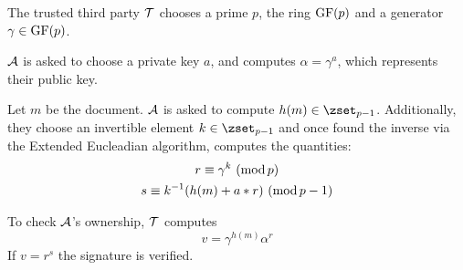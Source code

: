 \documentclass{subfiles}
\begin{document}
    \begin{procedure}
        \caption{DSA()}\label{proc:DSA}
        \nl The trusted third party $\operatorname{\mathcal{T}}$ chooses a prime $p$,
            the ring $\operatorname{GF}(p)$ and a generator $\gamma \in \operatorname{GF}(p)$.
            \DontPrintSemicolon\;

        \nl $\operatorname{\mathcal{A}}$ is asked to choose a private key $a$, 
            and computes $\alpha = \gamma^{a}$, which represents their public key.
            \DontPrintSemicolon\;

        \nl Let $m$ be the document. $\operatorname{\mathcal{A}}$ is asked to compute $h(m) \in \zset_{p - 1}$.
            Additionally, they choose an invertible element $k \in \zset_{p - 1}$
            and once found the inverse via the Extended Eucleadian algorithm,
            computes the quantities:
            $$\begin{gathered}
                r \equiv \gamma^{k} \mod \\ 
                s \equiv k^{-1} (h(m) + a * r) \mod[p - 1]
            \end{gathered}$$
            \DontPrintSemicolon\;
        
        \nl To check $\operatorname{\mathcal{A}}$'s ownership, $\operatorname{\mathcal{T}}$ computes
        $$
            v = \gamma^{h(m)} \alpha^{r}
        $$
        If $v = r^{s}$ the signature is verified.
        \DontPrintSemicolon\;

    \end{procedure}
\end{document}
